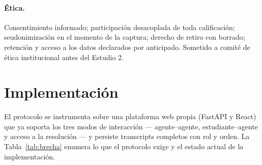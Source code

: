 \documentclass[11pt,a4paper]{article}
\theoremstyle{definition}
\theoremstyle{plain}
\theoremstyle{remark}
\begin{document}
\paragraph{Ética.} Consentimiento informado; participación desacoplada de toda
calificación; seudonimización en el momento de la captura; derecho de retiro con
borrado; retención y acceso a los datos declarados por anticipado. Sometido a
comité de ética institucional antes del Estudio 2.

\section{Implementación}\label{sec:implementacion}

El protocolo se instrumenta sobre una plataforma web propia (FastAPI y React) que
ya soporta los tres modos de interacción --- agente--agente, estudiante--agente y
acceso a la resolución --- y persiste transcripts completos con rol y orden. La
Tabla~\ref{tab:brecha} enumera lo que el protocolo exige y el estado actual de la
implementación.
\end{document}
